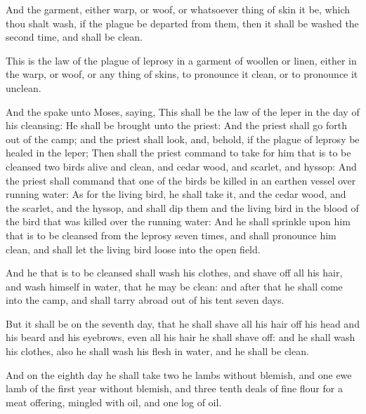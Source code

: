 \Verse And the garment, either warp, or woof, or whatsoever thing of skin it be, which thou shalt wash, if the plague be departed from them, then it shall be washed the second time, and shall be clean.

\Verse This is the law of the plague of leprosy in a garment of woollen or linen, either in the warp, or woof, or any thing of skins, to pronounce it clean, or to pronounce it unclean.

\Chapter
\Verse And the \LORD spake unto Moses, saying, \Verse This shall be the law of the leper in the day of his cleansing: He shall be brought unto the priest: \Verse And the priest shall go forth out of the camp; and the priest shall look, and, behold, if the plague of leprosy be healed in the leper; \Verse Then shall the priest command to take for him that is to be cleansed two birds alive and clean, and cedar wood, and scarlet, and hyssop: \Verse And the priest shall command that one of the birds be killed in an earthen vessel over running water: \Verse As for the living bird, he shall take it, and the cedar wood, and the scarlet, and the hyssop, and shall dip them and the living bird in the blood of the bird that was killed over the running water: \Verse And he shall sprinkle upon him that is to be cleansed from the leprosy seven times, and shall pronounce him clean, and shall let the living bird loose into the open field.

\Verse And he that is to be cleansed shall wash his clothes, and shave off all his hair, and wash himself in water, that he may be clean: and after that he shall come into the camp, and shall tarry abroad out of his tent seven days.

\Verse But it shall be on the seventh day, that he shall shave all his hair off his head and his beard and his eyebrows, even all his hair he shall shave off: and he shall wash his clothes, also he shall wash his flesh in water, and he shall be clean.

\Verse And on the eighth day he shall take two he lambs without blemish, and one ewe lamb of the first year without blemish, and three tenth deals of fine flour for a meat offering, mingled with oil, and one log of oil.

